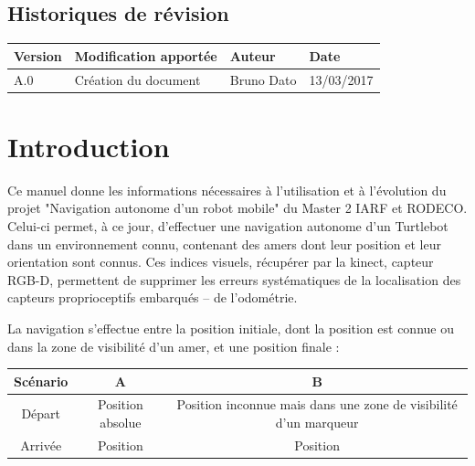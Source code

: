 \documentclass[10pt,a4paper]{article}
\begin{document}
\subsection*{Historiques de révision}

\begin{center}
    \begin{tabular}{| l | l | l | l |}
    \hline
     \rowcolor{gray} Version & Modification apportée & Auteur & Date \\ \hline
    A.0 & Création du document & Bruno Dato & 13/03/2017\\ \hline
     
    \end{tabular}
\end{center}

\newpage
\tableofcontents
\newpage

\section{Introduction}
\label{sec:introduction}

Ce manuel donne les informations nécessaires à l'utilisation et à l'évolution du projet "Navigation autonome d'un robot mobile" du Master 2 IARF et RODECO. Celui-ci permet, à ce jour, d'effectuer une navigation autonome  d'un Turtlebot dans un environnement connu, contenant des amers dont leur position et leur orientation sont connus. Ces indices visuels, récupérer par la kinect, capteur RGB-D, permettent de supprimer les erreurs systématiques de la localisation des capteurs proprioceptifs embarqués -- de l'odométrie. 

La navigation s'effectue entre la position initiale, dont la position est connue ou dans la zone de visibilité d'un amer, et une position finale : 

\begin{tabular}{c|c|c}
Scénario & A & B \\ \hline
Départ & Position absolue & Position inconnue mais dans une zone de visibilité d'un marqueur \\  \hline
Arrivée & Position & Position 
\end{tabular} \\
\end{document}
